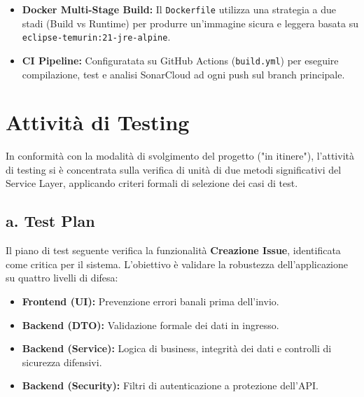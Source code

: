 \documentclass[a4paper,12pt]{article}
\begin{document}
\begin{tcolorbox}[
    enhanced,
    colback=white,
    colframe=UninaBlue,
    boxrule=0.8pt,
    arc=3pt,
    sharp corners,
    title=Strategia di Deployment e CI,
    fonttitle=\bfseries,
    coltitle=white,
]
\begin{itemize}
    \item \textbf{Docker Multi-Stage Build:} Il \texttt{Dockerfile} utilizza una strategia a due stadi (Build vs Runtime) per produrre un'immagine sicura e leggera basata su \texttt{eclipse-temurin:21-jre-alpine}.
    \item \textbf{CI Pipeline:} Configuratata su GitHub Actions (\texttt{build.yml}) per eseguire compilazione, test e analisi SonarCloud ad ogni push sul branch principale.
\end{itemize}
\end{tcolorbox}


\clearpage
\section{Attività di Testing}

In conformità con la modalità di svolgimento del progetto ("in itinere"), l'attività di testing si è concentrata sulla verifica di unità di due metodi significativi del Service Layer, applicando criteri formali di selezione dei casi di test.

\subsection*{a. Test Plan}
{}

Il piano di test seguente verifica la funzionalità \textbf{Creazione Issue}, identificata come critica per il sistema. L'obiettivo è validare la robustezza dell'applicazione su quattro livelli di difesa:
\begin{itemize}
    \item \textbf{Frontend (UI):} Prevenzione errori banali prima dell'invio.
    \item \textbf{Backend (DTO):} Validazione formale dei dati in ingresso.
    \item \textbf{Backend (Service):} Logica di business, integrità dei dati e controlli di sicurezza difensivi.
    \item \textbf{Backend (Security):} Filtri di autenticazione a protezione dell'API.
\end{itemize}
\end{document}
